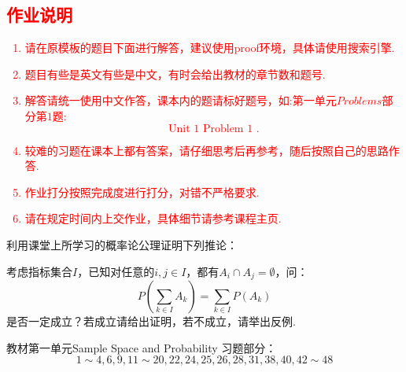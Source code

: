 \documentclass{oxmathproblems}
\begin{document}
\textcolor{red}{
\section*{作业说明}
\begin{enumerate}
  \item 请在原模板的题目下面进行解答，建议使用proof环境，具体请使用搜索引擎.
  \item 题目有些是英文有些是中文，有时会给出教材的章节数和题号.
  \item {解答请统一使用中文作答，课本内的题请标好题号，如:第一单元$Problems$部分第$1$题:
  \[ \text{Unit 1 Problem 1 }. \]
  }
  \item 较难的习题在课本上都有答案，请仔细思考后再参考，随后按照自己的思路作答.
  \item 作业打分按照完成度进行打分，对错不严格要求.
  \item 请在规定时间内上交作业，具体细节请参考课程主页.
\end{enumerate}
}
\newpage



\begin{questions}

\miquestion 利用课堂上所学习的概率论公理证明下列推论：

\miquestion
考虑指标集合$I$，已知对任意的$i, j \in I$，都有$A_i \cap A_j = \emptyset$，问：
\[ P(\sum_{k \in I}A_k )= \sum_{k \in I} P(A_k)\]
是否一定成立？若成立请给出证明，若不成立，请举出反例.

\miquestion
教材第一单元Sample Space and Probability 习题部分：
\[ 1\sim 4, 6, 9, 11\sim 20, 22, 24, 25, 26, 28, 31, 38, 40, 42\sim 48 \]

\end{questions}
\end{document}
